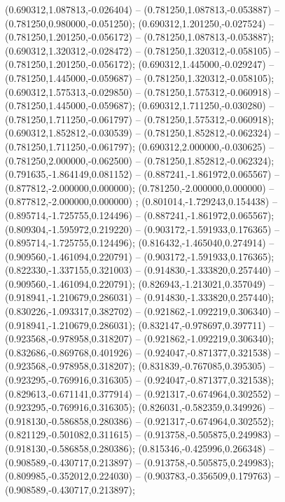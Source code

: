  (0.690312,1.087813,-0.026404) -- (0.781250,1.087813,-0.053887) -- (0.781250,0.980000,-0.051250);
 (0.690312,1.201250,-0.027524) -- (0.781250,1.201250,-0.056172) -- (0.781250,1.087813,-0.053887);
 (0.690312,1.320312,-0.028472) -- (0.781250,1.320312,-0.058105) -- (0.781250,1.201250,-0.056172);
 (0.690312,1.445000,-0.029247) -- (0.781250,1.445000,-0.059687) -- (0.781250,1.320312,-0.058105);
 (0.690312,1.575313,-0.029850) -- (0.781250,1.575312,-0.060918) -- (0.781250,1.445000,-0.059687);
 (0.690312,1.711250,-0.030280) -- (0.781250,1.711250,-0.061797) -- (0.781250,1.575312,-0.060918);
 (0.690312,1.852812,-0.030539) -- (0.781250,1.852812,-0.062324) -- (0.781250,1.711250,-0.061797);
 (0.690312,2.000000,-0.030625) -- (0.781250,2.000000,-0.062500) -- (0.781250,1.852812,-0.062324);
 (0.791635,-1.864149,0.081152) -- (0.887241,-1.861972,0.065567) -- (0.877812,-2.000000,0.000000);
 (0.781250,-2.000000,0.000000) -- (0.877812,-2.000000,0.000000) ;
 (0.801014,-1.729243,0.154438) -- (0.895714,-1.725755,0.124496) -- (0.887241,-1.861972,0.065567);
 (0.809304,-1.595972,0.219220) -- (0.903172,-1.591933,0.176365) -- (0.895714,-1.725755,0.124496);
 (0.816432,-1.465040,0.274914) -- (0.909560,-1.461094,0.220791) -- (0.903172,-1.591933,0.176365);
 (0.822330,-1.337155,0.321003) -- (0.914830,-1.333820,0.257440) -- (0.909560,-1.461094,0.220791);
 (0.826943,-1.213021,0.357049) -- (0.918941,-1.210679,0.286031) -- (0.914830,-1.333820,0.257440);
 (0.830226,-1.093317,0.382702) -- (0.921862,-1.092219,0.306340) -- (0.918941,-1.210679,0.286031);
 (0.832147,-0.978697,0.397711) -- (0.923568,-0.978958,0.318207) -- (0.921862,-1.092219,0.306340);
 (0.832686,-0.869768,0.401926) -- (0.924047,-0.871377,0.321538) -- (0.923568,-0.978958,0.318207);
 (0.831839,-0.767085,0.395305) -- (0.923295,-0.769916,0.316305) -- (0.924047,-0.871377,0.321538);
 (0.829613,-0.671141,0.377914) -- (0.921317,-0.674964,0.302552) -- (0.923295,-0.769916,0.316305);
 (0.826031,-0.582359,0.349926) -- (0.918130,-0.586858,0.280386) -- (0.921317,-0.674964,0.302552);
 (0.821129,-0.501082,0.311615) -- (0.913758,-0.505875,0.249983) -- (0.918130,-0.586858,0.280386);
 (0.815346,-0.425996,0.266348) -- (0.908589,-0.430717,0.213897) -- (0.913758,-0.505875,0.249983);
 (0.809985,-0.352012,0.224030) -- (0.903783,-0.356509,0.179763) -- (0.908589,-0.430717,0.213897);
